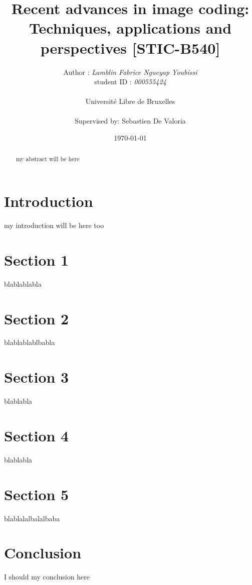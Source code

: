 \documentclass{article}
\title{\textbf{Recent advances in image coding:} \\ \textbf{Techniques, applications and perspectives [STIC-B540]}}
\author{Author : \emph{Lamblin Fabrice Ngueyap Youbissi} \\  student ID : \emph{000555424}
\\ \\ Université Libre de Bruxelles \\ \\ Supervised by: Sebastien De Valoria }
\date{\today}
\begin{document}
\maketitle

\begin{abstract}
my abstract will be here
\end{abstract}

\begin{multicols}{2}

\section{Introduction}
my introduction will be here too

\section{Section 1}
blablablabla

\section{Section 2}
blablablablbabla

\section{Section 3}
blablabla

\section{Section 4}
blablabla

\section{Section 5}
blablalalbalalbaba


\section{Conclusion}
I should my conclusion here

\end{multicols}

%

\end{document}
